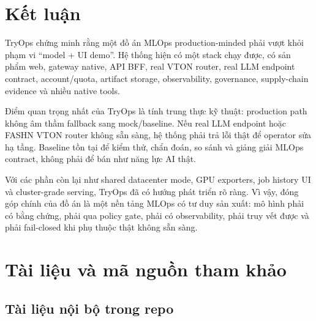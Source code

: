 \documentclass[12pt,a4paper,oneside]{report}
\begin{document}
\chapter{Kết luận}

TryOps chứng minh rằng một đồ án MLOps production-minded phải vượt khỏi phạm vi ``model + UI demo''. Hệ thống hiện có một stack chạy được, có sản phẩm web, gateway native, API BFF, real VTON router, real LLM endpoint contract, account/quota, artifact storage, observability, governance, supply-chain evidence và nhiều native tools.

Điểm quan trọng nhất của TryOps là tính trung thực kỹ thuật: production path không âm thầm fallback sang mock/baseline. Nếu real LLM endpoint hoặc FASHN VTON router không sẵn sàng, hệ thống phải trả lỗi thật để operator sửa hạ tầng. Baseline tồn tại để kiểm thử, chẩn đoán, so sánh và giảng giải MLOps contract, không phải để bán như năng lực AI thật.

Với các phần còn lại như shared datacenter mode, GPU exporters, job history UI và cluster-grade serving, TryOps đã có hướng phát triển rõ ràng. Vì vậy, đóng góp chính của đồ án là một nền tảng MLOps có tư duy sản xuất: mô hình phải có bằng chứng, phải qua policy gate, phải có observability, phải truy vết được và phải fail-closed khi phụ thuộc thật không sẵn sàng.

\chapter*{Tài liệu và mã nguồn tham khảo}

\section*{Tài liệu nội bộ trong repo}
\end{document}

